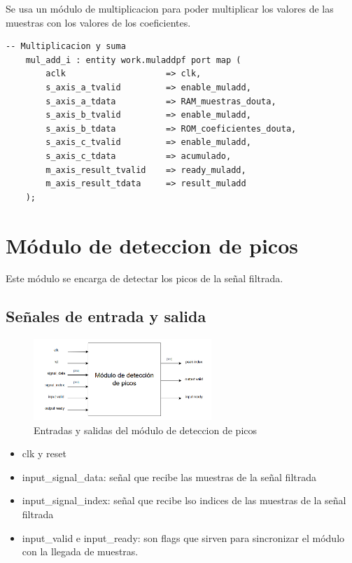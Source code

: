 Se usa un módulo de multiplicacion para poder multiplicar los valores de las muestras con los valores de los coeficientes.

\lstset{language=VHDL, breaklines=true, basicstyle=\footnotesize}
\begin{lstlisting}[frame=single] 
    -- Multiplicacion y suma 
    mul_add_i : entity work.muladdpf port map (
        aclk                    => clk,
        s_axis_a_tvalid         => enable_muladd,
        s_axis_a_tdata          => RAM_muestras_douta,
        s_axis_b_tvalid         => enable_muladd,
        s_axis_b_tdata          => ROM_coeficientes_douta,
        s_axis_c_tvalid         => enable_muladd,
        s_axis_c_tdata          => acumulado,                
        m_axis_result_tvalid    => ready_muladd,
        m_axis_result_tdata     => result_muladd
    );
\end{lstlisting}

\section{Módulo de deteccion de picos}

Este módulo se encarga de detectar los picos de la señal filtrada. 
\subsection{Señales de entrada y salida}

    \begin{figure}[h!]
        \centering
        \includegraphics[width=0.6\textwidth]{./Images/img_implementacion_hw/moddeteccionpicos.png}
        \caption{Entradas y salidas del módulo de deteccion de picos}
        \label{fig:moddeteccionpicos}
    \end{figure} 
    
    \begin{itemize}
    \item clk y reset
    \item input\_signal\_data: señal que recibe las muestras de la señal filtrada 
    \item input\_signal\_index: señal que recibe lso indices de las muestras de la señal filtrada 
    \item input\_valid e input\_ready: son flags que sirven para sincronizar el módulo con la llegada de muestras. 
    \end{itemize}
    
